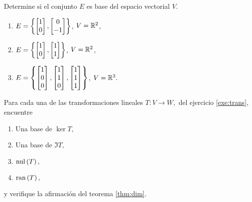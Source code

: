 \begin{problema}
 Determine si el conjunto $E$ es base del espacio vectorial $V.$
 \begin{enumerate}
  \item $E=\left\{ \begin{bmatrix}1\\0\end{bmatrix},\begin{bmatrix}0\\-1\end{bmatrix} \right\}$, $V=\mathbb{R}^{2}$,
  \item $E=\left\{ \begin{bmatrix}1\\0\end{bmatrix},\begin{bmatrix}1\\1\end{bmatrix} \right\}$, $V=\mathbb{R}^{2}$,
  \item $E=\left\{ \begin{bmatrix}1\\0\\0\end{bmatrix},\begin{bmatrix}1\\1\\0\end{bmatrix},\begin{bmatrix}1\\1\\1\end{bmatrix} \right\}$, $V=\mathbb{R}^{3}.$
 \end{enumerate}

\end{problema}


\begin{problema}
 Para cada una de las transformaciones lineales $T:V \to W,$ del ejercicio \ref{exe:trans}, encuentre
 \begin{enumerate}
  \item Una base de $\ker{T},$
  \item Una base de $\Im{T},$
  \item $\operatorname{nul}\left( T \right),$
  \item $\operatorname{ran}\left( T \right),$
\end{enumerate}
y verifique la afirmaci\'on del teorema \ref{thm:dim}.
\end{problema}








